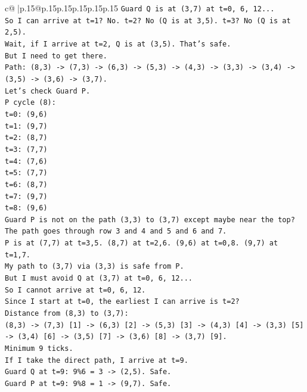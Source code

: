 \documentclass{article}
\begin{document}
{\begin{supertabular}{c@{$\;$}|p{.15\linewidth}@{}p{.15\linewidth}p{.15\linewidth}p{.15\linewidth}p{.15\linewidth}p{.15\linewidth}}
{{{\texttt{Guard Q is at (3,7) at t=0, 6, 12...} \\
\texttt{So I can arrive at t=1? No. t=2? No (Q is at 3,5). t=3? No (Q is at 2,5).} \\
\texttt{Wait, if I arrive at t=2, Q is at (3,5). That's safe.} \\
\texttt{But I need to get there.} \\
\texttt{Path: (8,3) {-}> (7,3) {-}> (6,3) {-}> (5,3) {-}> (4,3) {-}> (3,3) {-}> (3,4) {-}> (3,5) {-}> (3,6) {-}> (3,7).} \\
\texttt{Let's check Guard P.} \\
\texttt{P cycle (8):} \\
\texttt{t=0: (9,6)} \\
\texttt{t=1: (9,7)} \\
\texttt{t=2: (8,7)} \\
\texttt{t=3: (7,7)} \\
\texttt{t=4: (7,6)} \\
\texttt{t=5: (7,7)} \\
\texttt{t=6: (8,7)} \\
\texttt{t=7: (9,7)} \\
\texttt{t=8: (9,6)} \\
\texttt{Guard P is not on the path (3,3) to (3,7) except maybe near the top? The path goes through row 3 and 4 and 5 and 6 and 7.} \\
\texttt{P is at (7,7) at t=3,5. (8,7) at t=2,6. (9,6) at t=0,8. (9,7) at t=1,7.} \\
\texttt{My path to (3,7) via (3,3) is safe from P.} \\
\texttt{But I must avoid Q at (3,7) at t=0, 6, 12...} \\
\texttt{So I cannot arrive at t=0, 6, 12.} \\
\texttt{Since I start at t=0, the earliest I can arrive is t=2?} \\
\texttt{Distance from (8,3) to (3,7):} \\
\texttt{(8,3) {-}> (7,3) {[}1{]} {-}> (6,3) {[}2{]} {-}> (5,3) {[}3{]} {-}> (4,3) {[}4{]} {-}> (3,3) {[}5{]} {-}> (3,4) {[}6{]} {-}> (3,5) {[}7{]} {-}> (3,6) {[}8{]} {-}> (3,7) {[}9{]}.} \\
\texttt{Minimum 9 ticks.} \\
\texttt{If I take the direct path, I arrive at t=9.} \\
\texttt{Guard Q at t=9: 9\%6 = 3 {-}> (2,5). Safe.} \\
\texttt{Guard P at t=9: 9\%8 = 1 {-}> (9,7). Safe.} \\
}}}
\end{supertabular}}
\end{document}
